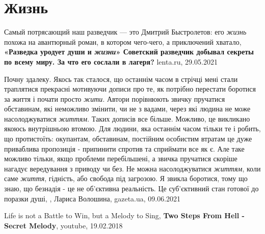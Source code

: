  
 
 
 
 
\chapter{Жизнь}

Самый потрясающий наш разведчик — это Дмитрий Быстролетов: его \emph{жизнь}
похожа на авантюрный роман, в котором чего-чего, а приключений хватало,
\textbf{«Разведка уродует души и \emph{жизни}» Советский разведчик добывал
секреты по всему миру. За что его сослали в лагеря?} lenta.ru, 29.05.2021

Почну здалеку. Якось так сталося, що останнім часом в стрічці мені стали
траплятися прекрасні мотивуючи дописи про те, як потрібно перестати боротися за
життя і почати просто \emph{жити}. Автори порівнюють звичку пручатися
обставинам, які неможливо змінити, чи не з вадами, через які людина не може
насолоджуватися \emph{життям}. Таких дописів все більше. Можливо, це викликано
якоюсь внутрішньою втомою. Для людини, яка останнім часом тільки те і робить,
що протистоїть: окупантам, обставинам, постійним особистим втратам це дуже
приваблива пропозиція - припинити спротив та сприймати все як є. Але таке
можливо тільки, якщо проблеми перебільшені, а звичка пручатися скоріше нагадує
вередування з приводу чи без. Не можна насолоджуватися \emph{життям}, коли саме
\emph{життя}, гідність, або свобода під загрозою. Я звикла боротися, тому що
знаю, що безнадія - це не об'єктивна реальність. Це суб'єктивний стан готової
до поразки душі, , Лариса Волошина, gazeta.ua, 09.06.2021

Life is not a Battle to Win, but a Melody to Sing,
\textbf{Two Steps From Hell - Secret Melody},
youtube, 19.02.2018

